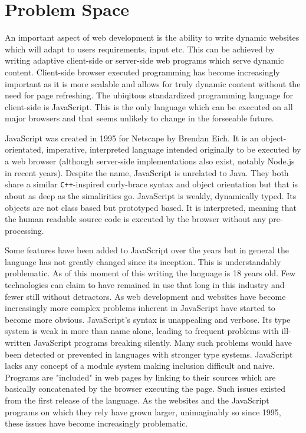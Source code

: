 
\section{Problem Space}
An important aspect of web development is the ability to write dynamic
websites which will adapt to users requirements, input etc. This can be
achieved by writing adaptive client-side or server-side web programs
which serve dynamic content. Client-side browser executed programming 
has become  increasingly important as it is more scalable and allows 
for truly dynamic content without the need for page refreshing. The 
ubiqitous standardized programming language for client-side is JavaScript.
This is the only language which can be executed on all major browsers and 
that seems unlikely to change in the forseeable future. 

JavaScript was created in 1995 for Netscape by Brendan Eich. It is an
object-orientated, imperative, interpreted language intended originally
to be executed by a web browser (although server-side implementations
also exist, notably Node.js in recent years). Despite the name, JavaScript
is unrelated to Java. They both share a similar \verb!C++!-inspired
curly-brace syntax and object orientation but that is about as deep as
the simalirities go. JavaScript is weakly, dynamically typed. Its objects
are not class based but prototyped based. It is interpreted, meaning
that the human readable source code is executed by the browser without
any pre-processing. 

Some features have been added to JavaScript over the years but in 
general the language has not greatly changed since its inception. This
is understandably problematic. As of this moment of this writing the
language is 18 years old. Few technologies can claim to have remained
in use that long in this industry and fewer still without detractors.
As web development and websites have become increasingly more complex
problems inherent in JavaScript have started to become more obvious.
JavaScript's syntax is unappealing and verbose. Its type system is 
weak in more than name alone, leading to frequent problems with ill-
written JavaScript programs breaking silently. Many such problems 
would have been detected or prevented in languages with stronger
type systems. JavaScript lacks any concept of a module system making
inclusion difficult and naive. Programs are "included" in web pages
by linking to their sources which are basically concatenated by the
browser executing the page. Such issues existed from the first 
release of the language. As the websites and the JavaScript
programs on which they rely have grown larger, unimaginably so since
1995, these issues have become increasingly problematic.

